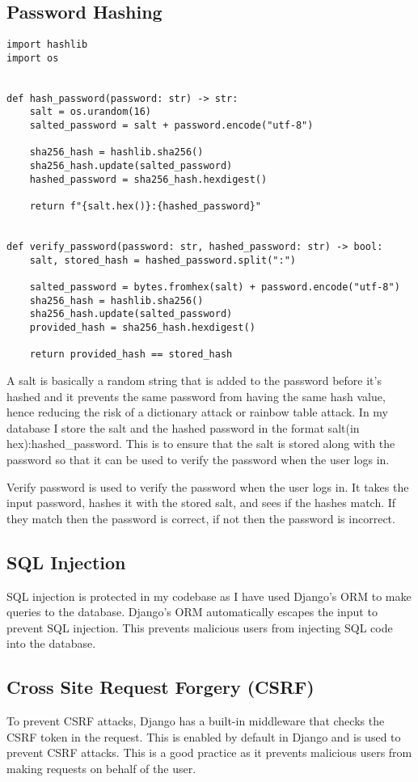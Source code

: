 \subsection{Password Hashing}
\begin{verbatim}
import hashlib
import os


def hash_password(password: str) -> str:
    salt = os.urandom(16)
    salted_password = salt + password.encode("utf-8")

    sha256_hash = hashlib.sha256()
    sha256_hash.update(salted_password)
    hashed_password = sha256_hash.hexdigest()

    return f"{salt.hex()}:{hashed_password}"


def verify_password(password: str, hashed_password: str) -> bool:
    salt, stored_hash = hashed_password.split(":")

    salted_password = bytes.fromhex(salt) + password.encode("utf-8")
    sha256_hash = hashlib.sha256()
    sha256_hash.update(salted_password)
    provided_hash = sha256_hash.hexdigest()

    return provided_hash == stored_hash

\end{verbatim}
A salt is basically a random string that is added to the password before it's hashed and it prevents the same password from having the same hash value, hence reducing the risk of a dictionary attack or rainbow table attack. In my database I store the salt and the hashed password in the format salt(in hex):hashed\_password. This is to ensure that the salt is stored along with the password so that it can be used to verify the password when the user logs in.

Verify password is used to verify the password when the user logs in. It takes the input password, hashes it with the stored salt, and sees if the hashes match. If they match then the password is correct, if not then the password is incorrect.

\subsection{SQL Injection}
SQL injection is protected in my codebase as I have used Django's ORM to make queries to the database. Django's ORM automatically escapes the input to prevent SQL injection. This prevents malicious users from injecting SQL code into the database. 

\subsection{Cross Site Request Forgery (CSRF)}
To prevent CSRF attacks, Django has a built-in middleware that checks the CSRF token in the request. This is enabled by default in Django and is used to prevent CSRF attacks. This is a good practice as it prevents malicious users from making requests on behalf of the user.

